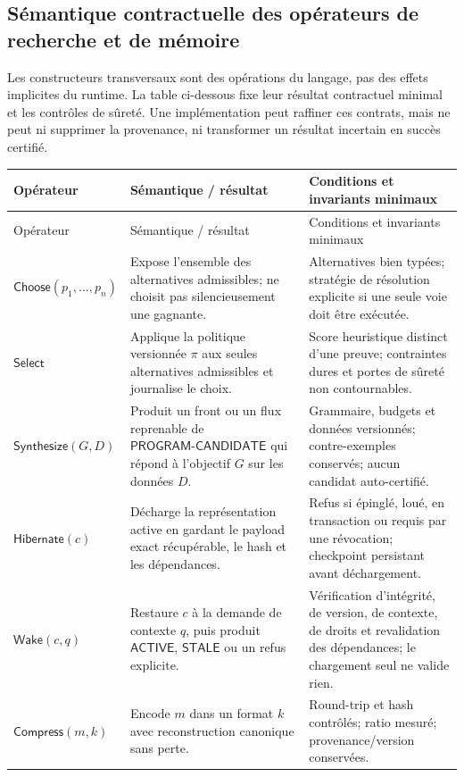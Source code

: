\documentclass[11pt,a4paper]{article}
\theoremstyle{definition}
\theoremstyle{plain}
\theoremstyle{remark}
\begin{document}
\subsection{Sémantique contractuelle des opérateurs de recherche et de mémoire}
Les constructeurs transversaux sont des opérations du langage, pas des effets implicites du runtime. La table ci-dessous fixe leur résultat contractuel minimal et les contrôles de sûreté. Une implémentation peut raffiner ces contrats, mais ne peut ni supprimer la provenance, ni transformer un résultat incertain en succès certifié.
\begin{longtable}{p{}p{}p{}}
\toprule Opérateur & Sémantique / résultat & Conditions et invariants minimaux \\
\midrule
\endfirsthead
\toprule Opérateur & Sémantique / résultat & Conditions et invariants minimaux \\
\midrule
\endhead
\(\mathsf{Choose}(p_1,\ldots,p_n)\) & Expose l'ensemble des alternatives admissibles; ne choisit pas silencieusement une gagnante. & Alternatives bien typées; stratégie de résolution explicite si une seule voie doit être exécutée. \\
\(\mathsf{Select}\) & Applique la politique versionnée \(\pi\) aux seules alternatives admissibles et journalise le choix. & Score heuristique distinct d'une preuve; contraintes dures et portes de sûreté non contournables. \\
\(\mathsf{Synthesize}(G,D)\) & Produit un front ou un flux reprenable de \(\mathsf{PROGRAM\mbox{-}CANDIDATE}\) qui répond à l'objectif \(G\) sur les données \(D\). & Grammaire, budgets et données versionnés; contre-exemples conservés; aucun candidat auto-certifié. \\
\(\mathsf{Hibernate}(c)\) & Décharge la représentation active en gardant le payload exact récupérable, le hash et les dépendances. & Refus si épinglé, loué, en transaction ou requis par une révocation; checkpoint persistant avant déchargement. \\
\(\mathsf{Wake}(c,q)\) & Restaure \(c\) à la demande de contexte \(q\), puis produit \(\mathsf{ACTIVE}\), \(\mathsf{STALE}\) ou un refus explicite. & Vérification d'intégrité, de version, de contexte, de droits et revalidation des dépendances; le chargement seul ne valide rien. \\
\(\mathsf{Compress}(m,k)\) & Encode \(m\) dans un format \(k\) avec reconstruction canonique sans perte. & Round-trip et hash contrôlés; ratio mesuré; provenance/version conservées. \\

\end{longtable}
\end{document}
